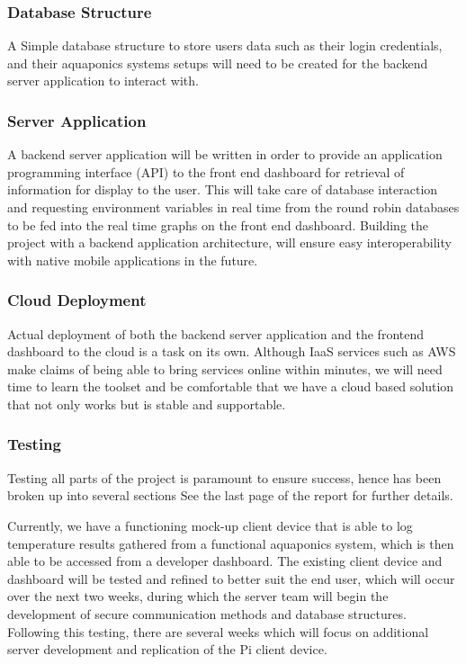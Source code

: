 \documentclass[11pt, oneside, a4paper, titlepage]{article}
\begin{document}
\subsubsection{Database Structure}
A Simple database structure to store users data such as their login credentials, and their aquaponics systems setups will need to be created for the backend server application to interact with. 

\subsubsection{Server Application}
A backend server application will be written in order to provide an application programming interface (API) to the front end dashboard for retrieval of information for display to the user.  This will take care of database interaction and requesting environment variables in real time from the round robin databases to be fed into the real time graphs on the front end dashboard.  Building the project with a backend application architecture, will ensure easy interoperability with native mobile applications in the future.

\subsubsection{Cloud Deployment}
Actual deployment of both the backend server application and the frontend dashboard to the cloud is a task on its own.  Although IaaS services such as AWS make claims of being able to bring services online within minutes, we will need time to learn the toolset and be comfortable that we have a cloud based solution that not only works but is stable and supportable. 

\subsubsection{Testing}
Testing all parts of the project is paramount to ensure success, hence has been broken up into several sections  See the last page of the report for further details. 

Currently, we have a functioning mock-up client device that is able to log temperature results gathered from a functional aquaponics system, which is then able to be accessed from a developer dashboard. The existing client device and dashboard will be tested and refined to better suit the end user, which will occur over the next two weeks, during which the server team will begin the development of secure communication methods and database structures. Following this testing, there are several weeks which will focus on additional server development and replication of the Pi client device.  
\end{document}
